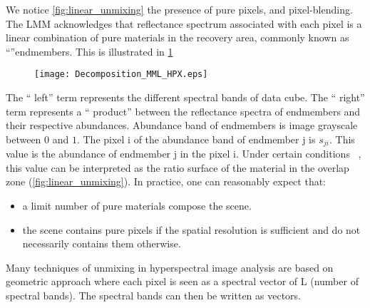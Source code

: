 We notice \ref{fig:linear_unmixing} the
presence of pure pixels, and pixel-blending. The LMM acknowledges that
reflectance spectrum associated with each pixel is a linear combination of pure materials in the recovery area, commonly known as ``''endmembers. This is illustrated in \ref{fig:decomp_mml}

\begin{figure}[h]
  \centering
  \texttt{[image: Decomposition\_MML\_HPX.eps]}
  \label{fig:decomp_mml}
\end{figure}
The `` left'' term represents the different spectral bands of
data cube. The `` right'' term represents a `` product''
between the reflectance spectra of endmembers and their respective abundances. Abundance band of endmembers is
image grayscale between $0$ and $1$. The pixel i of the
abundance band of endmember j is $s_ {ji}$. This value is the
abundance of endmember j in the pixel i. Under certain conditions
~\cite{Huck2009}, this value can be interpreted as the ratio
surface of the material in the overlap zone (\ref{fig:linear_unmixing}). In
practice, one can reasonably expect that: 

\begin{itemize}
\item{a limit number
of pure materials compose the scene.}
\item{the scene contains pure pixels if the spatial resolution is sufficient and
do not necessarily contains them otherwise.}
\end{itemize}

Many techniques of unmixing in hyperspectral image analysis
are based on geometric approach where each pixel is seen as a spectral
vector of L (number of spectral bands). The
spectral bands can then be written as vectors.

\begin{figure}[h]
\label{fig:mml}
\end{figure}

